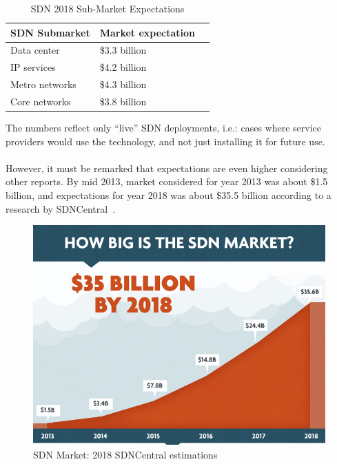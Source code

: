 \documentclass[a4paper, 12pt]{book}
\begin{document}
\begin{table}[H]
\footnotesize
\begin{center}
\begin{tabular}{|l|l|l|}
\hline
\textbf{SDN Submarket} & \textbf{Market expectation} \\ \hline
Data center	& \$3.3 billion \\ \hline
IP services	& \$4.2 billion \\ \hline
Metro networks &	\$4.3 billion \\ \hline
Core networks & \$3.8 billion  \\ \hline
\end{tabular}
\end{center}
\caption{SDN 2018 Sub-Market Expectations}
\label{tab:2018submarketexpectations}
\end{table}
The numbers reflect only “live” SDN deployments, i.e.: cases where service providers would use the technology, and not just installing it for future use.\\
\\
However, it must be remarked that expectations are even higher considering other reports. By mid 2013, market considered for year 2013 was about \$1.5 billion, and expectations for year 2018 was about \$35.5 billion according to a research by SDNCentral~\cite{SDN2018expectations01}.

\begin{center}
 \begin{figure}[H]
 \begin{center}
   \includegraphics[width=15cm]{img/sdn_estimations_2018.png}
   \caption{SDN Market: 2018 SDNCentral estimations}
   \label{fig:sdn2018estimations}
 \end{center}
 \end{figure}
\end{center}
\end{document}
